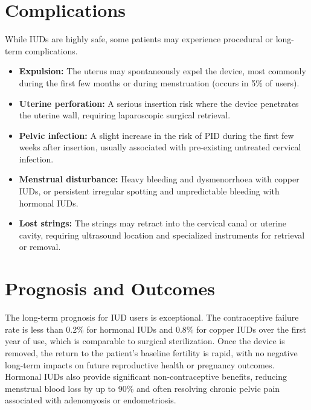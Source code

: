 \section*{Complications}
While IUDs are highly safe, some patients may experience procedural or long-term complications.
\begin{itemize}
    \item \textbf{Expulsion:} The uterus may spontaneously expel the device, most commonly during the first few months or during menstruation (occurs in 5\% of users).
    \item \textbf{Uterine perforation:} A serious insertion risk where the device penetrates the uterine wall, requiring laparoscopic surgical retrieval.
    \item \textbf{Pelvic infection:} A slight increase in the risk of PID during the first few weeks after insertion, usually associated with pre-existing untreated cervical infection.
    \item \textbf{Menstrual disturbance:} Heavy bleeding and dysmenorrhoea with copper IUDs, or persistent irregular spotting and unpredictable bleeding with hormonal IUDs.
    \item \textbf{Lost strings:} The strings may retract into the cervical canal or uterine cavity, requiring ultrasound location and specialized instruments for retrieval or removal.
\end{itemize}

\section*{Prognosis and Outcomes}
The long-term prognosis for IUD users is exceptional. The contraceptive failure rate is less than 0.2\% for hormonal IUDs and 0.8\% for copper IUDs over the first year of use, which is comparable to surgical sterilization. Once the device is removed, the return to the patient’s baseline fertility is rapid, with no negative long-term impacts on future reproductive health or pregnancy outcomes. Hormonal IUDs also provide significant non-contraceptive benefits, reducing menstrual blood loss by up to 90\% and often resolving chronic pelvic pain associated with adenomyosis or endometriosis.

